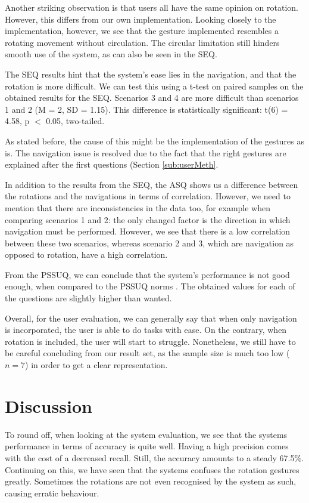 \documentclass[11pt,a4paper]{article}
\begin{document}
Another striking observation is that users all have the same opinion on rotation. However, this differs from our own implementation. Looking closely to the implementation, however, we see that the gesture implemented resembles a rotating movement without circulation. The circular limitation still hinders smooth use of the system, as can also be seen in the SEQ.

The SEQ results hint that the system's ease lies in the navigation, and that the rotation is more difficult. We can test this using a t-test on paired samples on the obtained results for the SEQ. Scenarios 3 and 4 are more difficult than scenarios 1 and 2 (M = 2, SD = 1.15). This difference is statistically significant: t(6) = 4.58, p $<$ 0.05, two-tailed. 

 As stated before, the cause of this might be the implementation of the gestures as is. The navigation issue is resolved due to the fact that the right gestures are explained after the first questions (Section \ref{sub:userMeth}.
 
In addition to the results from the SEQ, the ASQ shows us a difference between the rotations and the navigations in terms of correlation. However, we need to mention that there are inconsistencies in the data too, for example when comparing scenarios 1 and 2: the only changed factor is the direction in which navigation must be performed. However, we see that there is a low correlation between these two scenarios, whereas scenario 2 and 3, which are navigation as opposed to rotation, have a high correlation.

From the PSSUQ, we can conclude that the system's performance is not good enough, when compared to the PSSUQ norms \cite{sauro2012quantifying}. The obtained values for each of the questions are slightly higher than wanted. 

Overall, for the user evaluation, we can generally say that when only navigation is incorporated, the user is able to do tasks with ease. On the contrary, when rotation is included, the user will start to struggle. Nonetheless, we still have to be careful concluding from our result set, as the sample size is much too low ($n=7$) in order to get a clear representation.  

\section{Discussion}
To round off, when looking at the system evaluation, we see that the systems performance in terms of accuracy is quite well. Having a high precision comes with the cost of a decreased recall. Still, the accuracy amounts to a steady 67.5\%. Continuing on this, we have seen that the systems confuses the rotation gestures greatly. Sometimes the rotations are not even recognised by the system as such, causing erratic behaviour.
\end{document}
